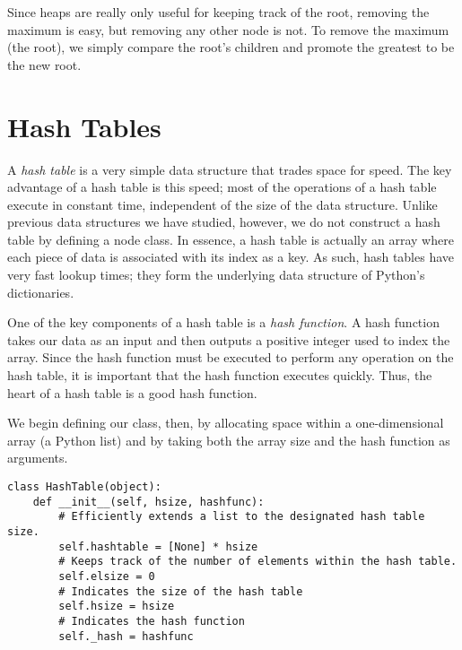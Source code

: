 Since heaps are really only useful for keeping track of the root, removing the maximum is easy, but removing any other node is not.
To remove the maximum (the root), we simply compare the root's children and promote the greatest to be the new root.

\section*{Hash Tables}
A \emph{hash table} is a very simple data structure that trades space for speed.
The key advantage of a hash table is this speed; most of the operations of a hash table execute in constant time, independent of the size of the data structure.
Unlike previous data structures we have studied, however, we do not construct a hash table by defining a node class.
In essence, a hash table is actually an array where each piece of data is associated with its index as a key.
As such, hash tables have very fast lookup times; they form the underlying data structure of Python's dictionaries.

One of the key components of a hash table is a \emph{hash function}.
A hash function takes our data as an input and then outputs a positive integer used to index the array.
Since the hash function must be executed to perform any operation on the hash table, it is important that the hash function executes quickly.
Thus, the heart of a hash table is a good hash function.

We begin defining our  class, then, by allocating space within a one-dimensional array (a Python list) and by taking both the array size and the hash function as arguments.
\begin{lstlisting}
class HashTable(object):
    def __init__(self, hsize, hashfunc):
        # Efficiently extends a list to the designated hash table size.
        self.hashtable = [None] * hsize
        # Keeps track of the number of elements within the hash table.
        self.elsize = 0
        # Indicates the size of the hash table
        self.hsize = hsize
        # Indicates the hash function
        self._hash = hashfunc
\end{lstlisting}

